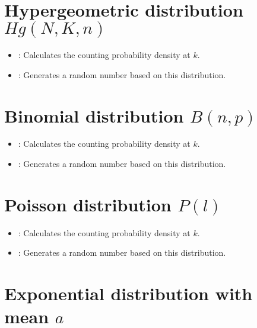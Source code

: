 \section{Hypergeometric distribution \texorpdfstring{$Hg(N,K,n)$}{Hg(N,K,n)}}

\begin{itemize}

\item
{}:
Calculates the counting probability density at $k$.

\item
{}:
Generates a random number based on this distribution.

\end{itemize}



\section{Binomial distribution \texorpdfstring{$B(n,p)$}{B(n,p)}}

\begin{itemize}

\item
{}:
Calculates the counting probability density at $k$.

\item
{}:
Generates a random number based on this distribution.

\end{itemize}



\section{Poisson distribution \texorpdfstring{$P(l)$}{P(l)}}

\begin{itemize}

\item
{}:
Calculates the counting probability density at $k$.

\item
{}:
Generates a random number based on this distribution.

\end{itemize}



\section{Exponential distribution with mean \texorpdfstring{$a$}{a}}

